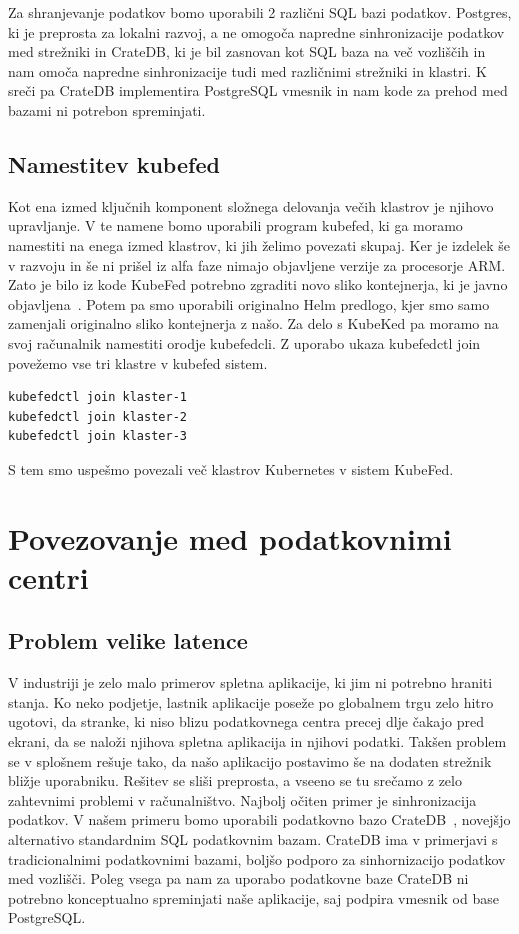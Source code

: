 \documentclass[a4paper, 12pt]{book}
\begin{document}
Za shranjevanje podatkov bomo uporabili 2 različni SQL bazi podatkov.
Postgres, ki je preprosta za lokalni razvoj, a ne omogoča napredne sinhronizacije podatkov med strežniki in CrateDB, ki je bil zasnovan kot SQL baza na več vozliščih in nam omoča napredne sinhronizacije tudi med različnimi strežniki in klastri.
K sreči pa CrateDB implementira PostgreSQL vmesnik in nam kode za prehod med bazami ni potrebon spreminjati.
\section{Namestitev kubefed}
Kot ena izmed ključnih komponent složnega delovanja večih klastrov je njihovo upravljanje.
V te namene bomo uporabili program kubefed, ki ga moramo namestiti na enega izmed klastrov, ki jih želimo povezati skupaj.
Ker je izdelek še v razvoju in še ni prišel iz alfa faze nimajo objavljene verzije za procesorje ARM.
Zato je bilo iz kode KubeFed potrebno zgraditi novo sliko kontejnerja, ki je javno objavljena~\cite{https://hub.docker.com/r/hostops/kubefed}.
Potem pa smo uporabili originalno Helm predlogo, kjer smo samo zamenjali originalno sliko kontejnerja z našo.
Za delo s KubeKed pa moramo na svoj računalnik namestiti orodje kubefedcli.
Z uporabo ukaza kubefedctl join povežemo vse tri klastre v kubefed sistem.
\begin{verbatim}
kubefedctl join klaster-1
kubefedctl join klaster-2
kubefedctl join klaster-3
\end{verbatim}
S tem smo uspešmo povezali več klastrov Kubernetes v sistem KubeFed.
\chapter{Povezovanje med podatkovnimi centri}
\section{Problem velike latence}
V industriji je zelo malo primerov spletna aplikacije, ki jim ni potrebno hraniti stanja. 
Ko neko podjetje, lastnik aplikacije poseže po globalnem trgu zelo hitro ugotovi, da stranke, ki niso blizu podatkovnega centra precej dlje čakajo pred ekrani, da se naloži njihova spletna aplikacija in njihovi podatki.
Takšen problem se v splošnem rešuje tako, da našo aplikacijo postavimo še na dodaten strežnik bližje uporabniku. 
Rešitev se sliši preprosta, a vseeno se tu srečamo z zelo zahtevnimi problemi v računalništvo.
Najbolj očiten primer je sinhronizacija podatkov.
V našem primeru bomo uporabili podatkovno bazo CrateDB~\cite{cratedb}, novejšjo alternativo standardnim SQL podatkovnim bazam.
CrateDB ima v primerjavi s tradicionalnimi podatkovnimi bazami, boljšo podporo za sinhornizacijo podatkov med vozlišči.
Poleg vsega pa nam za uporabo podatkovne baze CrateDB ni potrebno konceptualno spreminjati naše aplikacije, saj podpira vmesnik od base PostgreSQL.
\end{document}
